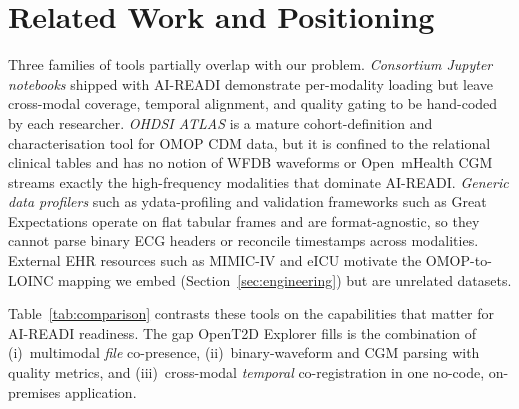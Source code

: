 \documentclass[conference]{IEEEtran}
\begin{document}
\section{Related Work and Positioning}
\label{sec:related}
Three families of tools partially overlap with our problem. \emph{Consortium Jupyter notebooks} shipped with AI-READI demonstrate per-modality loading but leave cross-modal coverage, temporal alignment, and quality gating to be hand-coded by each researcher. \emph{OHDSI ATLAS} \cite{hripcsak_george_observational_2015} is a mature cohort-definition and characterisation tool for OMOP CDM data, but it is confined to the relational clinical tables and has no notion of WFDB waveforms or Open~mHealth CGM streams exactly the high-frequency modalities that dominate AI-READI. \emph{Generic data profilers} such as ydata-profiling \cite{ydata_profiling} and validation frameworks such as Great Expectations \cite{great_expectations} operate on flat tabular frames and are format-agnostic, so they cannot parse binary ECG headers or reconcile timestamps across modalities. External EHR resources such as MIMIC-IV \cite{johnson_mimic_2023} and eICU \cite{pollard_eicu_2018} motivate the OMOP-to-LOINC mapping we embed (Section~\ref{sec:engineering}) but are unrelated datasets.

Table~\ref{tab:comparison} contrasts these tools on the capabilities that matter for AI-READI readiness. The gap OpenT2D Explorer fills is the combination of (i)~multimodal \emph{file} co-presence, (ii)~binary-waveform and CGM parsing with quality metrics, and (iii)~cross-modal \emph{temporal} co-registration in one no-code, on-premises application.
\end{document}
